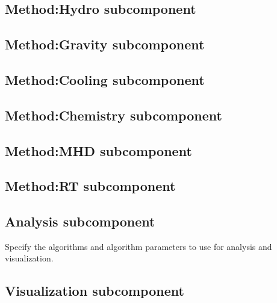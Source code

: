 \subsection{Method:Hydro subcomponent}

\subsection{Method:Gravity subcomponent}

\subsection{Method:Cooling subcomponent}

\subsection{Method:Chemistry subcomponent}

\subsection{Method:MHD subcomponent}

\subsection{Method:RT subcomponent}

\subsection{Analysis subcomponent} \label{ss:component-analysis}

 Specify the algorithms and algorithm parameters to use for analysis
 and visualization.

\subsection{Visualization subcomponent} \label{ss:component-visualization}

